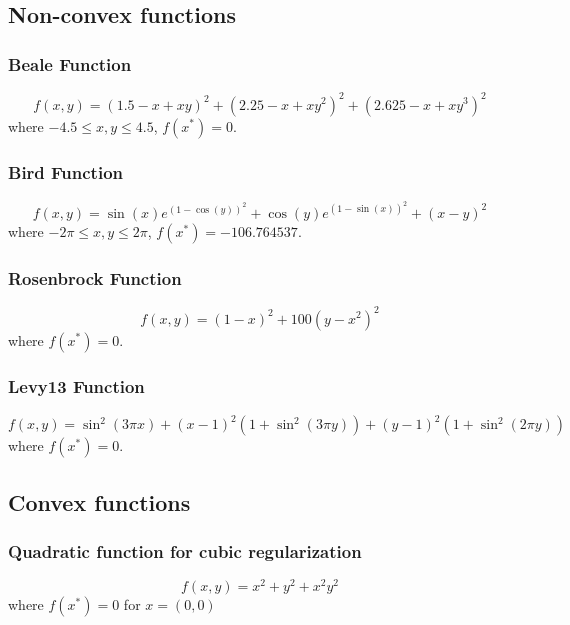 \documentclass{article}
\begin{document}
\subsection{Non-convex functions}

\subsubsection{Beale Function}
\begin{equation}
f(x,y) = (1.5 - x + xy)^2 + (2.25 - x + xy^2)^2 + (2.625 - x + xy^3)^2	
\end{equation}
where $-4.5\le x,y \le 4.5$, $f(x^*)=0$.

\subsubsection{Bird Function}
\begin{equation}
f(x,y) = \sin(x)e^{(1-\cos(y))^2} + \cos(y)e^{(1-\sin(x))^2} + (x-y)^2
\end{equation}
where $-2\pi \le x,y \le 2\pi$, $f(x^*)=-106.764537$.

\subsubsection{Rosenbrock Function}
\begin{equation}
f(x,y) = (1-x)^2 + 100(y-x^2)^2
\end{equation}
where $f(x^*)=0$.

\subsubsection{Levy13 Function}
\begin{equation}
f(x,y) = \sin^2(3\pi x) + (x-1)^2\left(1+\sin^2(3\pi y)\right) + (y-1)^2\left(1+\sin^2(2\pi y)\right)
\end{equation}
where $f(x^*)=0$.

\subsection{Convex functions}

\subsubsection{Quadratic function for cubic regularization}
\begin{equation}
f(x,y) = x^2 +y^2 + x^2y^2
\end{equation}
where $f(x^*) = 0$ for $x = (0,0)$
\end{document}
